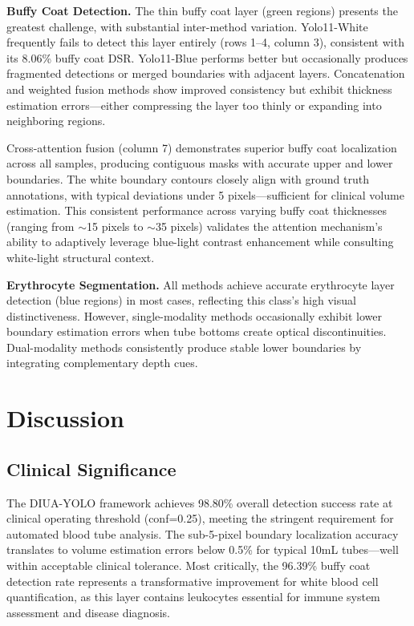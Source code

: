 \documentclass[journal,twoside,web]{ieeecolor}
\begin{document}
\textbf{Buffy Coat Detection.} The thin buffy coat layer (green regions) presents the greatest challenge, with substantial inter-method variation. Yolo11-White frequently fails to detect this layer entirely (rows 1--4, column 3), consistent with its 8.06\% buffy coat DSR. Yolo11-Blue performs better but occasionally produces fragmented detections or merged boundaries with adjacent layers. Concatenation and weighted fusion methods show improved consistency but exhibit thickness estimation errors—either compressing the layer too thinly or expanding into neighboring regions.

Cross-attention fusion (column 7) demonstrates superior buffy coat localization across all samples, producing contiguous masks with accurate upper and lower boundaries. The white boundary contours closely align with ground truth annotations, with typical deviations under 5 pixels—sufficient for clinical volume estimation. This consistent performance across varying buffy coat thicknesses (ranging from $\sim$15 pixels to $\sim$35 pixels) validates the attention mechanism's ability to adaptively leverage blue-light contrast enhancement while consulting white-light structural context.

\textbf{Erythrocyte Segmentation.} All methods achieve accurate erythrocyte layer detection (blue regions) in most cases, reflecting this class's high visual distinctiveness. However, single-modality methods occasionally exhibit lower boundary estimation errors when tube bottoms create optical discontinuities. Dual-modality methods consistently produce stable lower boundaries by integrating complementary depth cues.

\section{Discussion}

\subsection{Clinical Significance}
The DIUA-YOLO framework achieves 98.80\% overall detection success rate at clinical operating threshold (conf=0.25), meeting the stringent requirement for automated blood tube analysis. The sub-5-pixel boundary localization accuracy translates to volume estimation errors below 0.5\% for typical 10mL tubes—well within acceptable clinical tolerance. Most critically, the 96.39\% buffy coat detection rate represents a transformative improvement for white blood cell quantification, as this layer contains leukocytes essential for immune system assessment and disease diagnosis.
\end{document}
